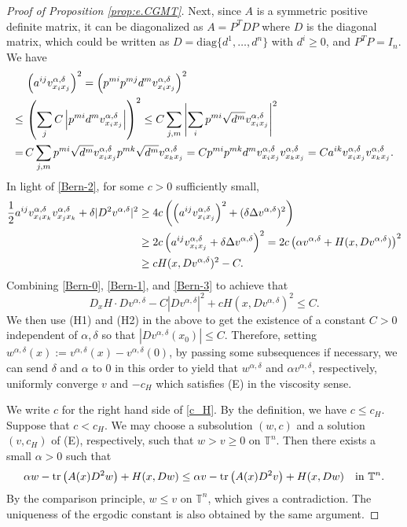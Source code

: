 \documentclass[12pt,reqno]{amsart}
\theoremstyle{plain}
\theoremstyle{remark}
\numberwithin{equation}{section}
\begin{document}
\begin{proof}[Proof of Proposition {\rm\ref{prop:e.CGMT}}]
Next, since $A$ is a symmetric positive definite matrix, it  can be diagonalized as $A=P^TDP$ where $D$ is the diagonal matrix, which could be written as $D=\text{diag}\{d^1,\ldots,d^n\}$ with $d^i \geq 0$, 
and $P^TP=I_n$. We have
\begin{align}
&\left(a^{ij} v^{{\alpha},{\delta}}_{x_i x_j} \right)^2=\left(p^{mi} p^{mj} d^m v^{{\alpha},{\delta}}_{x_i x_j}\right)^2\notag\\
\leq\,&
\left(\sum_j C\left|p^{mi}d^mv^{{\alpha},{\delta}}_{x_i x_j}\right| \right)^2
\leq
C \sum_{j,m} \left|\sum_i p^{mi} \sqrt{d^m} v^{{\alpha},{\delta}}_{x_i x_j}\right|^2\notag\\
=\,&
C\sum_{j,m} p^{mi} \sqrt{d^m}v^{{\alpha},{\delta}}_{x_i x_j} p^{mk}\sqrt{d^m}v^{{\alpha},{\delta}}_{x_kx_j}
=
Cp^{mi}p^{mk}d^mv^{{\alpha},{\delta}}_{x_i x_j} v^{{\alpha},{\delta}}_{x_k x_j}
=
C a^{ik} v^{{\alpha},{\delta}}_{x_i x_j} v^{{\alpha},{\delta}}_{x_k x_j}. \label{Bern-2}
\end{align}
In light of \eqref{Bern-2}, for some $c>0$ sufficiently small,
\begin{align}
\frac{1}{2}a^{ij}v^{{\alpha},{\delta}}_{x_i x_k}v^{{\alpha},{\delta}}_{x_j x_k}+{\delta}|D^2 v^{{\alpha},{\delta}}|^2
&\geq 
4c\left(\left(a^{ij}v^{{\alpha},{\delta}}_{x_ix_j}\right)^2+({\delta} {\Delta} v^{{\alpha},{\delta}})^2 \right)\notag\\
&\geq 
2c \left(a^{ij}v^{{\alpha},{\delta}}_{x_i x_j}+{\delta} {\Delta} v^{{\alpha},{\delta}}\right)^2
=
2c \left ({\alpha} v^{{\alpha},{\delta}}+H(x,Dv^{{\alpha},{\delta}})\right)^2 \notag\\
&\geq
c H(x,Dv^{{\alpha},{\delta}})^2-C.  \label{Bern-3}
\end{align}
Combining \eqref{Bern-0}, \eqref{Bern-1}, and \eqref{Bern-3} to achieve that
$$
D_xH\cdot Dv^{{\alpha},{\delta}}-C|Dv^{{\alpha},{\delta}}|^2+c H(x,Dv^{{\alpha},{\delta}})^2 \leq C.
$$
We then use (H1) and (H2) in the above to get the existence of a constant $C>0$ independent of ${\alpha},{\delta}$ so that $|Dv^{{\alpha},{\delta}}(x_0)| \leq C$.
Therefore, setting $w^{{\alpha},{\delta}}(x):=v^{{\alpha},{\delta}}(x)-v^{{\alpha},{\delta}}(0)$, 
by passing some subsequences if necessary, we can send ${\delta}$ and ${\alpha}$ to $0$ in this order to yield that $w^{{\alpha},{\delta}}$ and ${\alpha} v^{{\alpha},{\delta}}$, respectively, uniformly converge $v$ and $-c_H$ which satisfies (E) in the viscosity sense. 

We write $c$ for the right hand side of \eqref{c_H}. By the definition, we have $c\le c_H$. 
Suppose that $c<c_H$. We may choose a subsolution $(w,c)$ and a solution $(v,c_H)$ of (E), respectively, such that $w>v\ge0$ on ${\mathbb{T}}^n$. 
Then there exists a small ${\alpha}>0$ such that 
\[
{\alpha} w-{{\rm tr}\,}\big(A(x)D^2w\big)+H(x,Dw)\le 
{\alpha} v-{{\rm tr}\,}\big(A(x)D^2v\big)+H(x,Dw) \quad \text{in} \ {\mathbb{T}}^n.  
\]
By the comparison principle, $w\le v$ on ${\mathbb{T}}^n$, which gives a contradiction. 
The uniqueness of the ergodic constant is also obtained by the same argument. 
\end{proof}
\end{document}
